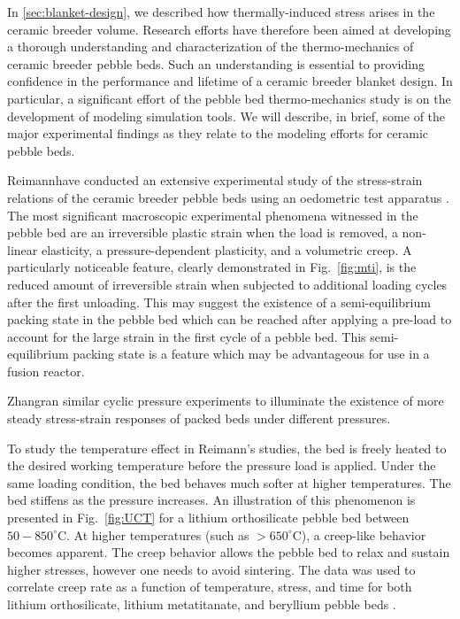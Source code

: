 In \cref{sec:blanket-design}, we described how thermally-induced stress arises in the ceramic breeder volume. Research efforts have therefore been aimed at developing a thorough understanding and characterization of the thermo-mechanics of ceramic breeder pebble beds. Such an understanding is essential to providing confidence in the performance and lifetime of a ceramic breeder blanket design. In particular, a significant effort of the pebble bed thermo-mechanics study is on the development of modeling simulation tools. We will describe, in brief, some of the major experimental findings as they relate to the modeling efforts for ceramic pebble beds.

Reimann\etal have conducted an extensive experimental study of the stress-strain relations of the ceramic breeder pebble beds using an oedometric test apparatus \cite{Piazza2002811,Reimann:2002kl,Reimann:2003qc,Reimann:2002mi,Reimann:2001il}. The most significant macroscopic experimental phenomena witnessed in the pebble bed are an irreversible plastic strain when the load is removed, a non-linear elasticity, a pressure-dependent plasticity, and a volumetric creep.  A particularly noticeable feature, clearly demonstrated in Fig.~\ref{fig:mti}, is the reduced amount of irreversible strain when subjected to additional loading cycles after the first unloading. This may suggest the existence of a semi-equilibrium packing state in the pebble bed which can be reached after applying a pre-load to account for the large strain in the first cycle of a pebble bed. This semi-equilibrium packing state is a feature which may be advantageous for use in a fusion reactor.

Zhang\etal ran similar cyclic pressure experiments to illuminate the existence of more steady stress-strain responses of packed beds under different pressures. 

To study the temperature effect in Reimann's studies, the bed is freely heated to the desired working temperature before the pressure load is applied. Under the same loading condition, the bed behaves much softer at higher temperatures. The bed stiffens as the pressure increases. An illustration of this phenomenon is presented in Fig.~\ref{fig:UCT} for a lithium orthosilicate pebble bed between $50-850^\circ$C. At higher temperatures (such as $> 650^\circ$C), a creep-like behavior becomes apparent. The creep behavior allows the pebble bed to relax and sustain higher stresses, however one needs to avoid sintering. The data was used to correlate creep rate as a function of temperature, stress, and time for both lithium orthosilicate, lithium metatitanate, and beryllium pebble beds \cite{Buhler:2002qf,Reimann:2001il,Reimann:2005qa}.


